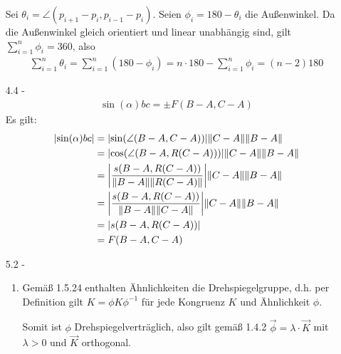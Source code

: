 \documentclass{article}
\begin{document}
\begin{enumerate}
		Sei $\theta_i = \angle(p_{i+1} - p_i, p_{i-1} - p_i)$. Seien $\phi_i = 180 - \theta_i$ die Außenwinkel. Da die Außenwinkel gleich orientiert und linear unabhängig sind, gilt $\sum_{i = 1}^n \phi_i = 360$, also
		\begin{align*}
			\sum_{i = 1}^n \theta_i = \sum_{i = 1}^n (180 - \phi_i) = n \cdot 180 - \sum_{i = 1}^n \phi_i = (n-2)180
		\end{align*}
		\item[4.4 - \tbf{3}]
		\begin{align*}
			\sin(\alpha)bc = \pm F(B-A, C-A)
		\end{align*}
		Es gilt:
		\begin{align*}
			\abs{\sin(\alpha)bc}
			&=
			\abs{\sin(\angle(B-A,C-A))}\norm{C-A}\norm{B-A}\\
			&=
			\abs{\cos(\angle(B-A,R(C-A)))}\norm{C-A}\norm{B-A}\\
			&=
			\abs{\frac{s(B-A, R(C-A))}{\norm{B-A}\norm{R(C-A)}}}\norm{C-A}\norm{B-A}\\
			&=
			\abs{\frac{s(B-A, R(C-A))}{\norm{B-A}\norm{C-A}}}\norm{C-A}\norm{B-A}\\
			&=
			\abs{s(B-A,R(C-A))}\\
			&= F(B-A,C-A)
		\end{align*}
		
		\clearpage
		
		\item[5.2 - \tbf{2}]
		\begin{enumerate}
			\item Gemäß 1.5.24 enthalten Ähnlichkeiten die Drehspiegelgruppe, d.h. per Definition gilt $K = \phi K \phi^{-1}$ für jede Kongruenz $K$ und Ähnlichkeit $\phi$.
			
			Somit ist $\phi$ Drehspiegelverträglich, also gilt gemäß 1.4.2 $\vec \phi = \lambda \cdot \vec K$ mit $\lambda > 0$ und $\vec K$ orthogonal.
			

\end{enumerate}
\end{enumerate}
\end{document}
